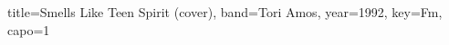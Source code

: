 \documentclass{bekki-leadsheet}
\begin{document}
\begin{song}[transpose-capo=true]{title={Smells Like Teen Spirit (cover)}, band={Tori Amos}, year={1992}, key={Fm}, capo={1}}



\end{song}
\end{document}

